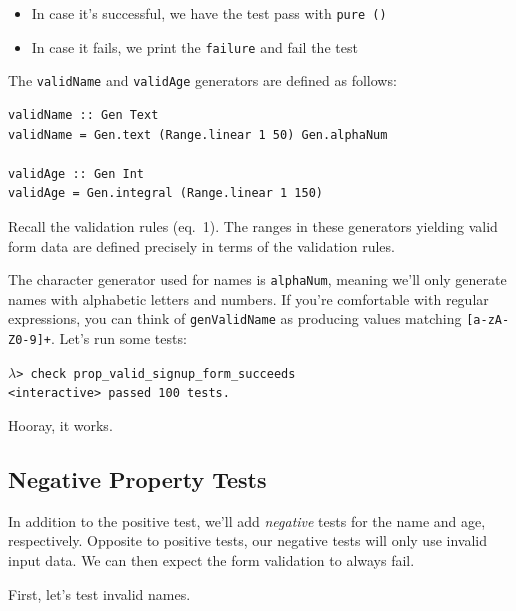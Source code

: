 \begin{itemize}
\item
  In case it's successful, we have the test pass with \texttt{pure\ ()}
\item
  In case it fails, we print the \texttt{failure\textquotesingle{}} and
  fail the test
\end{itemize}

The \texttt{validName} and \texttt{validAge} generators are defined as
follows:

\begin{verbatim}
validName :: Gen Text
validName = Gen.text (Range.linear 1 50) Gen.alphaNum

validAge :: Gen Int
validAge = Gen.integral (Range.linear 1 150)
\end{verbatim}
Recall the validation rules (eq.~1). The ranges in these generators
yielding valid form data are defined precisely in terms of the
validation rules.

The character generator used for names is \texttt{alphaNum}, meaning
we'll only generate names with alphabetic letters and numbers. If you're
comfortable with regular expressions, you can think of
\texttt{genValidName} as producing values matching
\texttt{{[}a-zA-Z0-9{]}+}.
Let's run some tests:

\vspace{\baselineskip}

\begin{minipage}[l]{\textwidth}
\noindent$\lambda$\verb|> check prop_valid_signup_form_succeeds| \\
  \hspace*{1cm}\checkmark \verb|<interactive> passed 100 tests.|
\end{minipage}

\vspace{\baselineskip}

\noindent Hooray, it works.

\subsection{Negative Property Tests}\label{negative-property-tests}

In addition to the positive test, we'll add \emph{negative} tests for
the name and age, respectively. Opposite to positive tests, our negative
tests will only use invalid input data. We can then expect the form
validation to always fail.

First, let's test invalid names.

